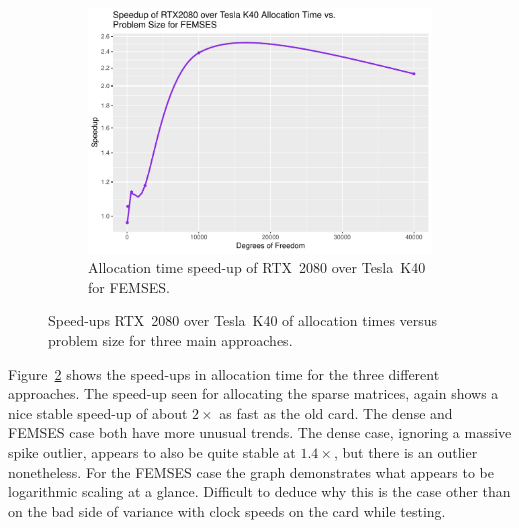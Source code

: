 \begin{figure}
\begin{subfigure}{0.48\linewidth}
		\centering
		\includegraphics[width=\linewidth]{Plots/alloc_femses_rtx_speedup_vs_n}
		\caption{Allocation time speed-up of RTX~2080 over Tesla~K40 for FEMSES.}
		\label{fig:alloc_rtx_femses}
	\end{subfigure}
	\caption{Speed-ups RTX~2080 over Tesla~K40 of allocation times versus problem size for three main approaches.}
	\label{fig:alloc_rtx}
\end{figure}

Figure~\ref{fig:alloc_rtx} shows the speed-ups in allocation time for the three different approaches. The speed-up seen for allocating the sparse matrices, again shows a nice stable speed-up of about $2\times$ as fast as the old card. The dense and FEMSES case both have more unusual trends. The dense case, ignoring a massive spike outlier, appears to also be quite stable at $1.4\times$, but there is an outlier nonetheless. For the FEMSES case the graph demonstrates what appears to be logarithmic scaling at a glance. Difficult to deduce why this is the case other than on the bad side of variance with clock speeds on the card while testing.

